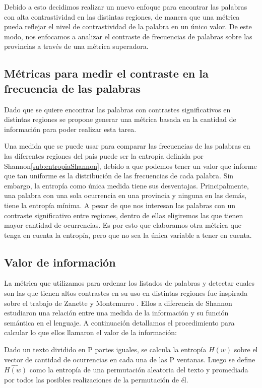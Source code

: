 Debido a esto decidimos realizar un nuevo enfoque para encontrar las palabras con alta contrastividad en las distintas regiones, de manera que una métrica pueda reflejar el nivel de contrastividad de la palabra en un único valor.
De este modo, nos enfocamos a analizar el contraste de frecuencias de palabras sobre las provincias a través de una métrica superadora.

\subsection{Métricas para medir el contraste en la frecuencia de las palabras}
Dado que se quiere encontrar las palabras con contrastes significativos en distintas 
regiones se propone generar una métrica basada en la cantidad de información 
para poder realizar esta tarea.

Una medida que se puede usar para comparar las frecuencias de las palabras en las diferentes regiones del país puede ser la entropía definida por Shannon\ref{sub:entropiaShannon}, debido a que podemos tener un valor que informe que tan uniforme es la distribución de las frecuencias de cada palabra.
Sin embargo, la entropía como única medida tiene sus desventajas. Principalmente, una palabra con una sola ocurrencia en una provincia y ninguna en las demás, tiene la entropía mínima. A pesar de que nos interesan las palabras con un contraste significativo entre regiones, dentro de ellas eligiremos las que tienen mayor cantidad de ocurrencias. Es por esto que elaboramos otra métrica que tenga en cuenta la entropía, pero que no sea la única variable a tener en cuenta.


\subsection{Valor de información}
La métrica que utilizamos para ordenar los listados de palabras y detectar cuales son
las que tienen altos contrastes en su uso en distintas regiones fue inspirada sobre el
trabajo de Zanette y Montemurro \cite{montemurro2010towards}.
Ellos a diferencia de Shannon estudiaron una relación entre una medida de la información y su función semántica en el lenguaje.
A continuación detallamos el procedimiento para calcular lo que ellos llamaron
el valor de la información:

Dado un texto dividido en P partes iguales, se calcula la entropía  $H(w)$ sobre el vector de cantidad de ocurrencias en cada una de las P ventanas.
Luego se define $\widehat{H(w)}$  como la entropía de una permutación aleatoria del texto y promediada por todos las posibles realizaciones de la permutación de él. 

